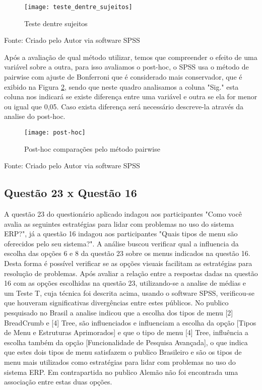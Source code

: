 \begin{figure}[H]
	\centering	
	\caption{Teste dentre sujeitos}
	\texttt{[image: teste\_dentre\_sujeitos]}
	\label{fig:figura-metodo_teste_dentre_sujeitos}
\end{figure}
\vspace{-0.8 cm} \hspace{2.85 cm} Fonte: Criado pelo Autor via software SPSS\newline

Após a avaliação de qual método utilizar, temos que compreender o efeito de uma variável sobre a outra, para isso avaliamos o post-hoc, o SPSS usa o método de pairwise com ajuste de Bonferroni que é considerado mais conservador, que é exibido na Figura \ref{fig:figura-post-hoc}, sendo que neste quadro analisamos a coluna "Sig." esta coluna nos indicará se existe diferença entre uma variável e outra se ela for menor ou igual que 0,05. Caso exista diferença será necessário descreve-la através da analise do post-hoc.

\begin{figure}[H]
	\centering	
	\caption{Post-hoc comparações pelo método pairwise }
	\texttt{[image: post-hoc]}
	\label{fig:figura-post-hoc}
\end{figure}
\vspace{-0.8 cm} \hspace{2.85 cm} Fonte: Criado pelo Autor via software SPSS\newline

\subsection{Questão 23 x Questão 16}

A questão 23 do questionário aplicado indagou aos participantes "Como você avalia as seguintes estratégias para lidar com problemas no uso do sistema ERP?", já a questão 16 indagou aos participantes "Quais tipos de menu são oferecidos pelo seu sistema?". A análise buscou verificar qual a influencia da escolha das opções 6 e 8 da questão 23 sobre os menus indicados na questão 16. Desta forma é possível verificar se as opções visuais facilitam as estratégias para resolução de problemas.\newline
\indent Após avaliar a relação entre a  respostas dadas na  questão 16 com as opções  escolhidas na questão 23, utilizando-se a  analise de médias e um Teste T, cuja técnica foi descrita acima, usando o software SPSS, verificou-se que houveram significativas divergências entre estes públicos.\newline
\indent No publico pesquisado no Brasil a analise indicou que a escolha dos tipos de menu [2] BreadCrumb e [4] Tree, são influenciados e influenciam a escolha da opção [Tipos de Menu e Estruturas Aprimorados] e que o tipo de menu [4] Tree, influência a escolha também da opção [Funcionalidade de Pesquisa Avançada], o que indica que estes dois tipos de menu satisfazem o publico Brasileiro e  são os tipos de menu mais utilizados como estratégias para lidar com problemas no uso do sistema ERP. Em contrapartida no publico Alemão não foi encontrada uma associação entre estas duas opções.

